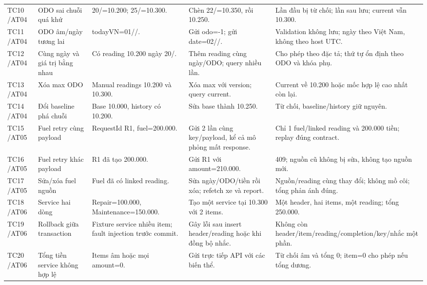 \begin{smalltable}
\begin{longtable}{L{1.2cm}L{2.5cm}L{3.6cm}L{3.6cm}L{3.7cm}}
TC10 /\allowbreak  AT04 & ODO sai chuỗi quá khứ & 20/=10.200; 25/=10.300. & Chèn 22/=10.350,  rồi 10.250. & Lần đầu bị từ chối; lần sau lưu; current vẫn 10.300.\\
TC11 /\allowbreak  AT04 & ODO âm/\allowbreak ngày tương lai & todayVN=01//. & Gửi odo=-1; gửi date=02//. & Validation không lưu; ngày theo Việt Nam,  không theo host UTC.\\
TC12 /\allowbreak  AT04 & Cùng ngày và giá trị bằng nhau & Có reading 10.200 ngày 20/. & Thêm reading cùng ngày/\allowbreak ODO; query nhiều lần. & Cho phép theo đặc tả; thứ tự ổn định theo ODO và khóa phụ.\\
TC13 /\allowbreak  AT04 & Xóa max ODO & Manual readings 10.200 và 10.300. & Xóa max với version; query current. & Current về 10.200 hoặc mốc hợp lệ cao nhất còn lại.\\
TC14 /\allowbreak  AT04 & Đổi baseline phá chuỗi & Base 10.000,  history có 10.200. & Sửa base thành 10.250. & Từ chối,  baseline/\allowbreak history giữ nguyên.\\
TC15 /\allowbreak  AT05 & Fuel retry cùng payload & RequestId R1,  fuel=200.000. & Gửi 2 lần cùng key/\allowbreak payload,  kể cả mô phỏng mất response. & Chỉ 1 fuel/\allowbreak linked reading và 200.000 tiền; replay đúng contract.\\
TC16 /\allowbreak  AT05 & Fuel retry khác payload & R1 đã tạo 200.000. & Gửi R1 với amount=210.000. & 409; nguồn cũ không bị sửa,  không tạo nguồn mới.\\
TC17 /\allowbreak  AT05 & Sửa/\allowbreak xóa fuel nguồn & Fuel đã có linked reading. & Sửa ngày/\allowbreak ODO/\allowbreak tiền rồi xóa; refetch xe và report. & Nguồn/\allowbreak reading cùng thay đổi; không mồ côi; tổng phản ánh đúng.\\
TC18 /\allowbreak  AT06 & Service hai dòng & Repair=100.000,  Maintenance=150.000. & Tạo một service tại 10.300 với 2 items. & Một header,  hai items,  một reading; tổng 250.000.\\
TC19 /\allowbreak  AT06 & Rollback giữa transaction & Fixture service nhiều item; fault injection trước commit. & Gây lỗi sau insert header/\allowbreak reading hoặc khi đồng bộ nhắc. & Không còn header/\allowbreak item/\allowbreak reading/\allowbreak completion/\allowbreak key/\allowbreak nhắc một phần.\\
TC20 /\allowbreak  AT06 & Tổng tiền service không hợp lệ & Items âm hoặc mọi amount=0. & Gửi trực tiếp API với các biến thể. & Từ chối âm và tổng 0; item=0 cho phép nếu tổng dương.\\

\end{longtable}
\end{smalltable}
